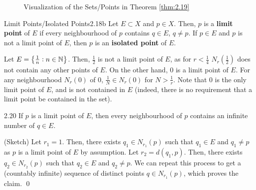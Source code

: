 \begin{figure}[htbp]
    \centering
    \caption{Visualization of the Sets/Points in Theorem \ref{thm:2.19}}
    \label{fig7}
\end{figure}

\setcounter{rudin}{17}
\begin{definition}{Limit Points/Isolated Points}{2.18b}
    Let $E \subset X$ and $p \in X$. Then, $p$ is a \textbf{limit point} of $E$ if every neighbourhood of $p$ contains $q \in E$, $q \neq p$. If $p \in E$ and $p$ is not a limit point of $E$, then $p$ is an \textbf{isolated point} of $E$. 
\end{definition}
\begin{nexample}{}{}
    Let $E = \set{\frac{1}{n}: n \in \mathbb{N}}$. Then, $\frac{1}{2}$ is not a limit point of $E$, as for $r < \frac{1}{4}$ $N_r(\frac{1}{2})$ does not contain any other points of $E$. On the other hand, $0$ is a limit point of $E$. For any neighbourhood $N_r(0)$ of $0$, $\frac{1}{N} \in N_r(0)$ for $N > \frac{1}{r}$. Note that $0$ is the only limit point of $E$, and is not contained in $E$ (indeed, there is no requirement that a limit point be contained in the set). 
\end{nexample}

\setcounter{rudin}{19}

\begin{theorem}{}{2.20}
    If $p$ is a limit point of $E$, then every neighbourhood of $p$ contains an infinite number of $q \in E$. 
\end{theorem}

\begin{nproof}
    (Sketch) Let $r_1 = 1$. Then, there exists $q_1 \in N_{r_1}(p)$ such that $q_1 \in E$ and $q_1 \neq p$ as $p$ is a limit point of $E$ by assumption. Let $r_2 = d(q_1, p)$. Then, there exists $q_2 \in N_{r_2}(p)$ such that $q_2 \in E$ and $q_2 \neq p$. We can repeat this process to get a (countably infinite) sequence of distinct points $q \in N_{r_1}(p)$, which proves the claim. \qed 
\end{nproof}


